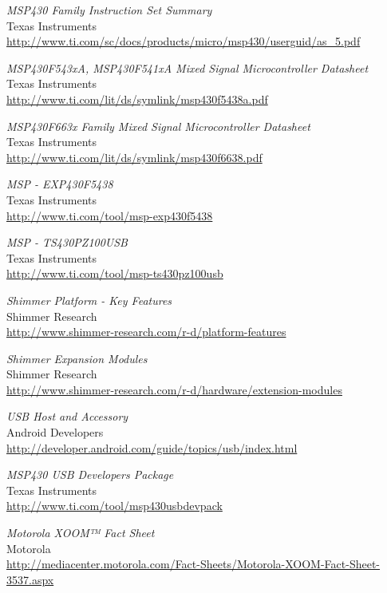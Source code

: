 \begin{thebibliography}{widest-label}
	\emph{MSP430 Family Instruction Set Summary}\\
	Texas Instruments\\
	\url{http://www.ti.com/sc/docs/products/micro/msp430/userguid/as_5.pdf}
	
	\emph{MSP430F543xA, MSP430F541xA Mixed Signal Microcontroller Datasheet}\\
	Texas Instruments\\
	\url{http://www.ti.com/lit/ds/symlink/msp430f5438a.pdf}
	
	\emph{MSP430F663x Family Mixed Signal Microcontroller Datasheet}\\
	Texas Instruments\\
	\url{http://www.ti.com/lit/ds/symlink/msp430f6638.pdf}

	\emph{MSP - EXP430F5438}\\
	Texas Instruments\\
	\url{http://www.ti.com/tool/msp-exp430f5438}

	\emph{MSP - TS430PZ100USB}\\
	Texas Instruments\\
	\url{http://www.ti.com/tool/msp-ts430pz100usb}

	\emph{Shimmer Platform - Key Features}\\
	Shimmer Research\\
	\url{http://www.shimmer-research.com/r-d/platform-features}

	\emph{Shimmer Expansion Modules}\\
	Shimmer Research\\
	\url{http://www.shimmer-research.com/r-d/hardware/extension-modules}

	\emph{USB Host and Accessory}\\
	Android Developers\\
	\url{http://developer.android.com/guide/topics/usb/index.html}
	
	\emph{MSP430 USB Developers Package}\\
	Texas Instruments\\
	\url{http://www.ti.com/tool/msp430usbdevpack}
	
	\emph{Motorola XOOM™ Fact Sheet}\\
	Motorola\\
	\url{http://mediacenter.motorola.com/Fact-Sheets/Motorola-XOOM-Fact-Sheet-3537.aspx}


\end{thebibliography}
